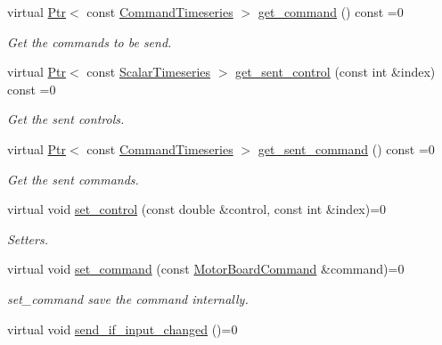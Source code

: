 \begin{DoxyCompactItemize}
virtual \hyperlink{classblmc__drivers_1_1MotorBoardInterface_a6a733b7ed7a3a96f6b0712b6bb5307f8}{Ptr}$<$ const \hyperlink{classblmc__drivers_1_1MotorBoardInterface_ae2afe94a023d9f08a4c689e9b7660f15}{Command\+Timeseries} $>$ \hyperlink{classblmc__drivers_1_1MotorBoardInterface_a4913308c1eacc98475aeb8647447c997}{get\+\_\+command} () const =0
\begin{DoxyCompactList}\small\item\em Get the commands to be send. \end{DoxyCompactList}\item 
virtual \hyperlink{classblmc__drivers_1_1MotorBoardInterface_a6a733b7ed7a3a96f6b0712b6bb5307f8}{Ptr}$<$ const \hyperlink{classblmc__drivers_1_1MotorBoardInterface_a14e237254ba495a66091ea3a3a33fa75}{Scalar\+Timeseries} $>$ \hyperlink{classblmc__drivers_1_1MotorBoardInterface_a8dc6222e915fc96d89b13cbb0fcb0cda}{get\+\_\+sent\+\_\+control} (const int \&index) const =0
\begin{DoxyCompactList}\small\item\em Get the sent controls. \end{DoxyCompactList}\item 
virtual \hyperlink{classblmc__drivers_1_1MotorBoardInterface_a6a733b7ed7a3a96f6b0712b6bb5307f8}{Ptr}$<$ const \hyperlink{classblmc__drivers_1_1MotorBoardInterface_ae2afe94a023d9f08a4c689e9b7660f15}{Command\+Timeseries} $>$ \hyperlink{classblmc__drivers_1_1MotorBoardInterface_afd3de58f7a900347154b8d323f1c1d94}{get\+\_\+sent\+\_\+command} () const =0
\begin{DoxyCompactList}\small\item\em Get the sent commands. \end{DoxyCompactList}\item 
virtual void \hyperlink{classblmc__drivers_1_1MotorBoardInterface_a3ace57ba3e09b9b3120d09303ff39a61}{set\+\_\+control} (const double \&control, const int \&index)=0
\begin{DoxyCompactList}\small\item\em Setters. \end{DoxyCompactList}\item 
virtual void \hyperlink{classblmc__drivers_1_1MotorBoardInterface_a86b4ff810ca652d6761090ceaff65621}{set\+\_\+command} (const \hyperlink{classblmc__drivers_1_1MotorBoardCommand}{Motor\+Board\+Command} \&command)=0
\begin{DoxyCompactList}\small\item\em set\+\_\+command save the command internally. \end{DoxyCompactList}\item 
virtual void \hyperlink{classblmc__drivers_1_1MotorBoardInterface_a79afd172c736718868f4d269125f2581}{send\+\_\+if\+\_\+input\+\_\+changed} ()=0\hypertarget{classblmc__drivers_1_1MotorBoardInterface_a79afd172c736718868f4d269125f2581}{}\label{classblmc__drivers_1_1MotorBoardInterface_a79afd172c736718868f4d269125f2581}


\end{DoxyCompactItemize}
